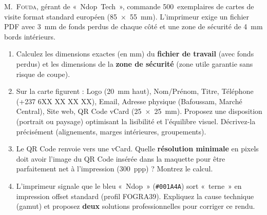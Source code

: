 \documentclass[11pt]{article}
\begin{document}
\begin{exercice}
M.~\textsc{Fouda}, gérant de « Ndop Tech », commande \SI{500}{exemplaires} de cartes de visite format standard européen (\SI{85 x 55}{mm}). L'imprimeur exige un fichier PDF avec \SI{3}{mm} de fonds perdus de chaque côté et une zone de sécurité de \SI{4}{mm} bords intérieurs.
\begin{enumerate}
    \item Calculez les dimensions exactes (en mm) du \textbf{fichier de travail} (avec fonds perdus) et les dimensions de la \textbf{zone de sécurité} (zone utile garantie sans risque de coupe).
    \item Sur la carte figurent : Logo (\SI{20}{mm} haut), Nom/Prénom, Titre, Téléphone (+237 6XX XX XX XX), Email, Adresse physique (Bafoussam, Marché Central), Site web, QR Code vCard (\SI{25 x 25}{mm}). Proposez une disposition (portrait ou paysage) optimisant la lisibilité et l'équilibre visuel. Décrivez-la précisément (alignements, marges intérieures, groupements).
    \item Le QR Code renvoie vers une vCard. Quelle \textbf{résolution minimale} en pixels doit avoir l'image du QR Code insérée dans la maquette pour être parfaitement net à l'impression (\SI{300}{ppp}) ? Montrez le calcul.
    \item L'imprimeur signale que le bleu « Ndop » (\texttt{\#001A4A}) sort « terne » en impression offset standard (profil FOGRA39). Expliquez la cause technique (gamut) et proposez \textbf{deux} solutions professionnelles pour corriger ce rendu.
\end{enumerate}
\end{exercice}
\end{document}
